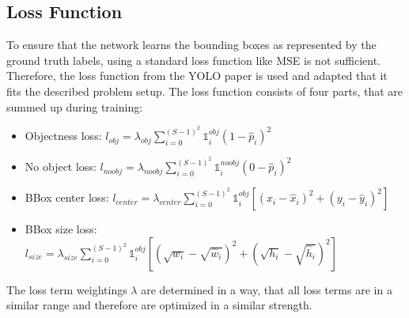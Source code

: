 \documentclass[landscape,a2,final,12pt]{issposter}
\begin{document}
\begin{multicols}{3}
\begin{samepage}
    \section{Loss Function}
            \begin{small} To ensure that the network learns the bounding boxes as represented by the ground truth labels, 
            using a standard loss function like MSE is not sufficient. Therefore, the loss function from the YOLO paper is used and adapted 
            that it fits the described problem setup. The loss function consists of four parts, that are summed up during training:
            \begin{itemize}
                \item Objectness loss: \quad $l_{obj} = \lambda_{obj} \sum_{i=0}^{(S-1)^2} \mathds{1}_{i}^{obj} (1 - \hat{p}_i)^2  $
                \item No object loss: \; \quad $l_{noobj} = \lambda_{noobj} \sum_{i=0}^{(S-1)^2} \mathds{1}_{i}^{noobj} (0 - \hat{p}_i)^2  $
                \item BBox center loss: \enspace $l_{center} = \lambda_{center} \sum_{i=0}^{(S-1)^2} \mathds{1}_{i}^{obj} [(x_i - \hat{x}_i)^2 + (y_i - \hat{y}_i)^2] $
                \item BBox size loss: \quad \enspace $l_{size} = \lambda_{size} \sum_{i=0}^{(S-1)^2} \mathds{1}_{i}^{obj} [(\sqrt{w_i} - \sqrt{\hat{w}_i})^2 + (\sqrt{h_i} - \sqrt{\hat{h}_i})^2] $
            \end{itemize}

            The loss term weightings $\lambda$ are determined in a way, that all loss terms are in a 
            similar range and therefore are optimized in a similar strength.


\end{small}
\end{samepage}
\end{multicols}
\end{document}
